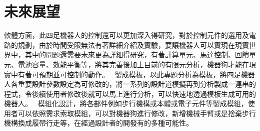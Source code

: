 \chapter{未來展望}
\hspace{-1.7em} 軟體方面，此四足機器人的控制還可以更加深入得研究，對於控制元件的選用及電路的規劃，由於時間受限無法有著詳細介紹及實驗，要讓機器人可以實現在現實世界中，其中的問題還需要未來更為詳細得研究，有著計算單元、馬達控制、回饋單元、電池容量、效能平衡等，將其完善後加上目前的有限元分析，機器狗才能在現實中有著可預期並可控制的動作。\
\hspace{-1.4em} 製成模板，以此專題分析為模板，將四足機器人各重要設計參數設定為可修改的，將一系列的設計道模擬再到分析製成一連串的程式，令後續使用者修改後就可以馬上進行分析，可以快速地透過模板生成可用的機器人。\
\hspace{-1.4em} 模組化設計，將各部件例如步行機構或本體或電子元件等製成模組，使用者可以依照需求索取模組，可以對機器狗進行修改，新增機械手臂或是捨棄步行機構換成履帶行走等，在經過設計者的開發有的多種可能性。
\newpage
